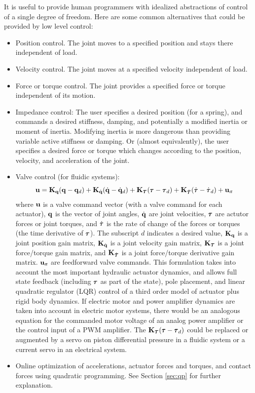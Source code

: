 \documentclass[letterpaper,12pt,fullpage]{article}
\newcommand{\ff}{{\mbox {\tiny ff}}}
\begin{document}
It is useful to provide human programmers
with idealized abstractions of control of a single degree of
freedom. Here are some common alternatives that could be provided by low level control:
\begin{itemize}
\item
Position control. The joint moves to a specified position and stays there independent
of load.
\item
Velocity control. The joint moves at a specified velocity independent of load.
\item
Force or torque control. The joint provides a specified force or torque independent
of its motion.
\item
Impedance control: The user specifies a desired position (for a spring), and commands
a desired
stiffness, damping, and potentially a modified inertia or moment of inertia.
Modifying inertia is more dangerous than providing variable active stiffness
or damping.
Or (almost equivalently),
the user specifies a desired force or torque
which changes according to the position, velocity,
and acceleration of the joint.
\item
Valve control (for fluidic systems):
\begin{equation}
\vu = \mK_{\vq} (\vq - \vq_d) + \mK_{\dot{\vq}} ( \dot{\vq} - \dot{\vq}_d )
+ \mK_{\vtau} ( \vtau - \vtau_d )
+ \mK_{\dot{\vtau}} ( \dot{\vtau} - \dot{\vtau}_d ) + \vu_{\ff}
\end{equation}
where ${\bf u}$ is a valve command vector (with a valve command for each actuator),
${\bf q}$ is the vector of joint angles, $\dot{{\bf q}}$ are joint velocities,
$\vtau$ are actutor forces or joint torques, and $\dot{\vtau}$ is the rate of change
of the forces or torques (the time derivative of $\vtau$). 
The subscript $d$ indicates a desired value,
${\bf K}_{{\bf q}}$ is a joint position gain matrix,
${\bf K}_{\dot{{\bf q}}}$ is a joint velocity gain matrix, 
$\mK_{\vtau}$ is a joint force/torque gain matrix,
and $\mK_{\dot{\vtau}}$ is a joint force/torque derivative gain matrix.
$\vu_{\ff}$ are feedforward valve commands.
This formulation takes into account the most important hydraulic actuator dynamics,
and allows full state feedback
(including $\vtau$ as part of the state), pole placement, and linear quadratic
regulator (LQR) control of
a third order model of actuator plus rigid body dynamics.
If electric motor and power amplifier dynamics are taken into account in electric
motor systems, there would be an analogous equation for the commanded
motor voltage of
an analog power amplifier or
the control input of a PWM amplifier.
The $\mK_{\vtau} ( \vtau - \vtau_d )$ could be replaced or augmented
by a servo on piston differential pressure in a fluidic system or
a current servo in an electrical system.
\item
Online optimization of accelerations, actuator forces and torques, and contact forces
using quadratic programming. See Section \ref{sec:qp} for further explanation.
\end{itemize} 
\end{document}
